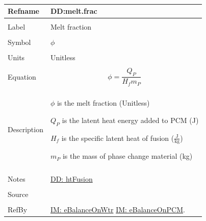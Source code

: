 \documentclass[12pt]{article}
\begin{document}
~\newline
 \noindent \begin{minipage}{\textwidth}
\begin{tabular}{p{} p{}}
\toprule \textbf{Refname} & \textbf{DD:melt.frac}
\label{DD:melt.frac}
\\ \midrule \\
Label & Melt fraction
        \\ \midrule \\
        Symbol & $ϕ$
                 \\ \midrule \\
                 Units & Unitless
                         \\ \midrule \\
                         Equation & \begin{dmath}
                                    ϕ=\frac{{Q_{P}}}{{H_{f}} {m_{P}}}
                                    \end{dmath}
                                    \\ \midrule \\
                                    Description & \begin{symbDescription}
                                                  \item{$ϕ$ is the melt fraction (Unitless)}
                                                  \item{${Q_{P}}$ is the latent heat energy added to PCM (J)}
                                                  \item{${H_{f}}$ is the specific latent heat of fusion ($\frac{\text{J}}{\text{kg}}$)}
                                                  \item{${m_{P}}$ is the mass of phase change material (kg)}
                                                  \end{symbDescription}
                                                  \\ \midrule \\
                                                  Notes & \hyperref[DD:htFusion]{DD: htFusion}
                                                          \\ \midrule \\
                                                          Source & \cite{koothoor2013}
                                                                   \\ \midrule \\
                                                                   RefBy & \hyperref[IM:eBalanceOnWtr]{IM: eBalanceOnWtr} \hyperref[IM:eBalanceOnPCM]{IM: eBalanceOnPCM}.
\\ \bottomrule \end{tabular}
\end{minipage}\\
\end{document}
